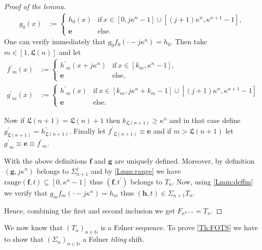 \documentclass[english, 11pt, a4paper]{article}
\theoremstyle{definition}
\numberwithin{equation}{section}
\newcommand{\bN}{\mathbb{N}}
\newcommand{\mbff}{\boldsymbol{f}}
\newcommand{\mbfg}{\boldsymbol{g}}
\newcommand{\mbfh}{\boldsymbol{h}}
\newcommand{\neutre}{\boldsymbol{e}}
\newcommand{\range}{\mathrm{range}}
\newcommand{\Landing}{\mathfrak{L}}
\begin{document}
\begin{proof}[Proof of the lemma]
\begin{align*}
    g_0(x)&:= \begin{cases} 
      h_0(x) &\text{if} \ x\in [0,j\kappa^n-1] \cup [(j+1)\kappa^n, \kappa^{n+1}-1],\\
      \neutre & \text{else.}
    \end{cases}
  \end{align*}
  One can verify immediately that $ g_0 f_0\left( \cdot -j\kappa^n \right)=h_0$.
  Then take $m \in [1,\Landing (n)]$ and let 
  \begin{align*}
    {f^\prime}_m(x)
    &:= {\begin{cases}
        {h^\prime}_m(x+j\kappa^n) &\text{if} \ x\in [k_m,\kappa^n-1],\\
        \neutre & \text{else,}
      \end{cases} }\\
    {g^\prime}_m(x)
    &:= {\begin{cases}
        {h^\prime}_m(x) & \text{if}\ x \in [k_m,j\kappa^n+k_m-1]
        \cup [(j+1)\kappa^n,\kappa^{n+1}-1]\\ 
        \neutre &\text{else.}
      \end{cases}} 
  \end{align*}
  
  Now if $\Landing(n+1)=\Landing(n)+1$ then $k_{\Landing(n+1)}\geq
  \kappa^n$ and in that case define
  $g^{\prime}_{\Landing(n+1)}=h^{\prime}_{\Landing(n+1)}$. 
  Finally let ${f^\prime}_{\Landing(n+1)}\equiv \neutre$ and if
  $m> \Landing(n+1)$ let $ {g^\prime}_m\equiv \neutre \equiv {f^\prime}_m$.
  
  With the above definitions $\mbff$ and $\mbfg$ are uniquely defined. Moreover,
  by definition $(\mbfg,j\kappa ^n)$ belongs to
  $\Sigma^j_{n+1}$ and by \cref{Lmm:range} we have $\range(\mbff,t) \subseteq
  [0,\kappa^n-1]$ thus $(\mbff,t^\prime)$ belongs to $T_{n}$.
  Now, using \cref{Lmm:deffm} we verify that $g_mf_m(\cdot
  -j\kappa^n)=h_m$ thus $(\mbfh,t) \in \Sigma_{n+1}T_{n}$.
  \smallskip

  Hence, combining the first and second inclusion we get $F_{\kappa^{n+1}}=T_{n}$.
\end{proof}
We now know that $(T_n)_{n\in \bN}$ is a Følner sequence. To prove \cref{Th:FOTS} we have
to show that $(\Sigma_n)_{n\in \bN}$ a Følner \emph{tiling} shift.
\end{document}
